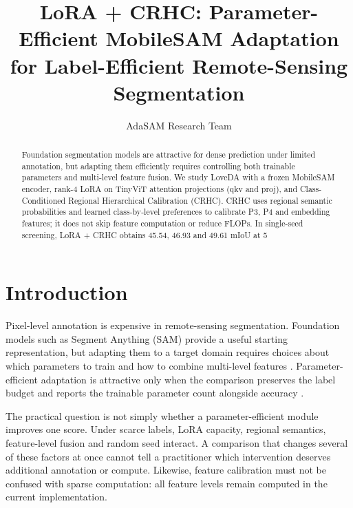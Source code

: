 \documentclass[10pt,twocolumn]{article}
\title{LoRA + CRHC: Parameter-Efficient MobileSAM Adaptation for Label-Efficient Remote-Sensing Segmentation}
\author{AdaSAM Research Team}
\date{}
\begin{document}
\maketitle

\begin{abstract}
Foundation segmentation models are attractive for dense prediction under limited annotation, but adapting them efficiently requires controlling both trainable parameters and multi-level feature fusion. We study LoveDA with a frozen MobileSAM encoder, rank-4 LoRA on TinyViT attention projections (qkv and proj), and Class-Conditioned Regional Hierarchical Calibration (CRHC). CRHC uses regional semantic probabilities and learned class-by-level preferences to calibrate P3, P4 and embedding features; it does not skip feature computation or reduce FLOPs. In single-seed screening, LoRA + CRHC obtains 45.54, 46.93 and 49.61 mIoU at 5%
\end{abstract}

\section{Introduction}
Pixel-level annotation is expensive in remote-sensing segmentation. Foundation models such as Segment Anything (SAM) provide a useful starting representation, but adapting them to a target domain requires choices about which parameters to train and how to combine multi-level features \cite{kirillov2023sam,chen2023samadapter,xiao2024catsam}. Parameter-efficient adaptation is attractive only when the comparison preserves the label budget and reports the trainable parameter count alongside accuracy \cite{zhang2023mobilesam,xiong2024efficientsam,zhao2023fastsam}.

The practical question is not simply whether a parameter-efficient module improves one score. Under scarce labels, LoRA capacity, regional semantics, feature-level fusion and random seed interact. A comparison that changes several of these factors at once cannot tell a practitioner which intervention deserves additional annotation or compute. Likewise, feature calibration must not be confused with sparse computation: all feature levels remain computed in the current implementation.
\end{document}
